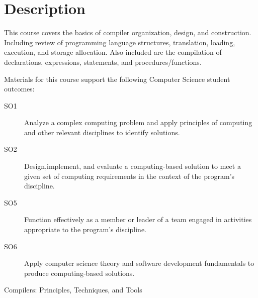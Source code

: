 \documentclass{../syllabus}
\begin{document}
\section*{Description}

This course covers the basics of compiler organization, design, and construction.
Including review of programming language structures, translation, loading, execution, and storage allocation.
Also included are the compilation of declarations, expressions, statements, and procedures/functions.

Materials for this course support the following Computer Science student outcomes:
\begin{description}
  \item[SO1] Analyze a complex computing problem and apply principles of computing and other relevant disciplines to identify solutions.
  \item[SO2] Design,implement, and evaluate a computing-based solution to meet a given set of computing requirements in the context of the program's discipline.
  \item[SO5] Function effectively as a member or leader of a team engaged in activities appropriate to the program's discipline.
  \item[SO6] Apply computer science theory and software development fundamentals to produce computing-based solutions.
\end{description}


\begin{text}{Compilers: Principles, Techniques, and Tools}
\end{text}

\nofees{}

\begin{grading}
\end{grading}

\learningaids


\withdrawal

\cheating

\ada
\end{document}
